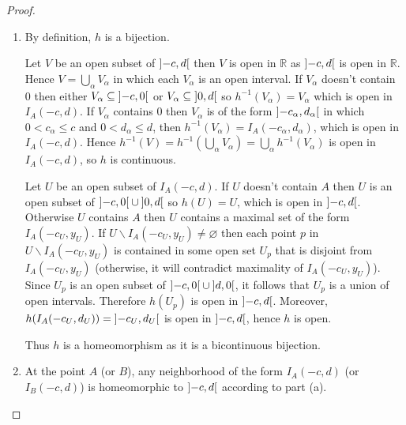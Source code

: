 \begin{proof}
    \begin{enumerate}[label={(\alph*)}]
        \item By definition, \( h \) is a bijection.

              Let \( V \) be an open subset of \( \left\rbrack{-c, d}\right\lbrack \) then \( V \) is open in \( \mathbb{R} \) as \( \left\rbrack{-c, d}\right\lbrack \) is open in \( \mathbb{R} \). Hence \( V = \bigcup_{\alpha} V_{\alpha} \) in which each \( V_{\alpha} \) is an open interval. If \( V_{\alpha} \) doesn't contain \( 0 \) then either \( V_{\alpha} \subseteq \left\rbrack{-c, 0}\right\lbrack \) or \( V_{\alpha} \subseteq \left\rbrack{0, d}\right\lbrack \) so \( h^{-1}(V_{\alpha}) = V_{\alpha} \) which is open in \( I_{A}(-c, d) \). If \( V_{\alpha} \) contains \( 0 \) then \( V_{\alpha} \) is of the form \( \left\rbrack{-c_{\alpha}, d_{\alpha}}\right\lbrack \) in which \( 0 < c_{\alpha} \leq c \) and \( 0 < d_{\alpha} \leq d \), then \( h^{-1}(V_{\alpha}) = I_{A}(-c_{\alpha}, d_{\alpha}) \), which is open in \( I_{A}(-c, d) \). Hence \( h^{-1}(V) = h^{-1}\left(\bigcup_{\alpha} V_{\alpha}\right) = \bigcup_{\alpha} h^{-1}(V_{\alpha}) \) is open in \( I_{A}(-c, d) \), so \( h \) is continuous.

              Let \( U \) be an open subset of \( I_{A}(-c, d) \). If \( U \) doesn't contain \( A \) then \( U \) is an open subset of \( \left\rbrack{-c, 0}\right\lbrack \cup \left\rbrack{0, d}\right\lbrack \) so \( h(U) = U \), which is open in \( \left\rbrack{-c, d}\right\lbrack \). Otherwise \( U \) contains \( A \) then \( U \) contains a maximal set of the form \( I_{A}(-c_{U}, y_{U}) \). If \( U \smallsetminus I_{A}(-c_{U}, y_{U}) \ne \varnothing \) then each point \( p \) in \( U \smallsetminus I_{A}(-c_{U}, y_{U}) \) is contained in some open set \( U_{p} \) that is disjoint from \( I_{A}(-c_{U}, y_{U}) \) (otherwise, it will contradict maximality of \( I_{A}(-c_{U}, y_{U}) \)). Since \( U_{p} \) is an open subset of \( \left\rbrack{-c, 0}\right\lbrack \cup \left\rbrack{d, 0}\right\lbrack \), it follows that \( U_{p} \) is a union of open intervals. Therefore \( h(U_{p}) \) is open in \( \left\rbrack{-c, d}\right\lbrack \). Moreover, \( h(I_{A}(-c_{U}, d_{U})) = \left\rbrack{-c_{U}, d_{U}}\right\lbrack \) is open in \( \left\rbrack{-c, d}\right\lbrack \), hence \( h \) is open.

              Thus \( h \) is a homeomorphism as it is a bicontinuous bijection.
        \item At the point \( A \) (or \(B\)), any neighborhood of the form \( I_{A}(-c, d) \) (or \( I_{B}(-c, d) \)) is homeomorphic to \( \left\rbrack{-c, d}\right\lbrack \) according to part (a).


\end{enumerate}
\end{proof}
